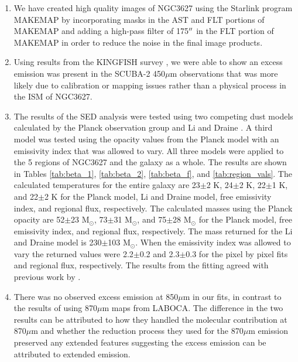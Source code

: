 \begin{enumerate}

\item{We have created high quality images of NGC3627 using the Starlink program MAKEMAP by incorporating masks in the AST and FLT portions of MAKEMAP and adding a high-pass filter of 175$\mbox{$^{\prime\prime}$}$ in the FLT portion of MAKEMAP in order to reduce the noise in the final image products.}

\item{Using results from the KINGFISH survey \citep{kennicutt2011}, we were able to show an excess emission was present in the SCUBA-2 450$\mu$m observations that was more likely due to calibration or mapping issues rather than a physical process in the ISM of NGC3627.}

\item{The results of the SED analysis were tested using two competing dust models calculated by the Planck observation group \citep{planckxxv2011} and Li and Draine \citep{li2001}.  A third model was tested using the opacity values from the Planck model with an emissivity index that was allowed to vary.  All three models were applied to the 5 regions of NGC3627 and the galaxy as a whole.  The results are shown in Tables \ref{tab:beta_1}, \ref{tab:beta_2}, \ref{tab:beta_f}, and \ref{tab:region_vals}.  The calculated temperatures for the entire galaxy are 23$\pm$2 K, 24$\pm$2 K, 22$\pm$1 K, and 22$\pm$2 K for the Planck model, Li and Draine model, free emissivity index, and regional flux, respectively.  The calculated masses using the Planck opacity are 52$\pm$23 M$_\odot$, 73$\pm$31 M$_\odot$, and 75$\pm$28 M$_\odot$ for the Planck model, free emissivity index, and regional flux, respectively.  The mass returned for the Li and Draine model is 230$\pm$103 M$_\odot$.  When the emissivity index was allowed to vary the returned values were 2.2$\pm$0.2 and 2.3$\pm$0.3 for the pixel by pixel fits and regional flux, respectively.  The results from the fitting agreed with previous work by \cite{galametz2012}.}

\item{There was no observed excess emission at 850$\mu$m in our fits, in contrast to the results of \cite{galametz2014} using 870$\mu$m maps from LABOCA.  The difference in the two results can be attributed to how they handled the molecular contribution at 870$\mu$m and whether the reduction process they used for the 870$\mu$m emission preserved any extended features suggesting the excess emission can be attributed to extended emission.}


\end{enumerate}
